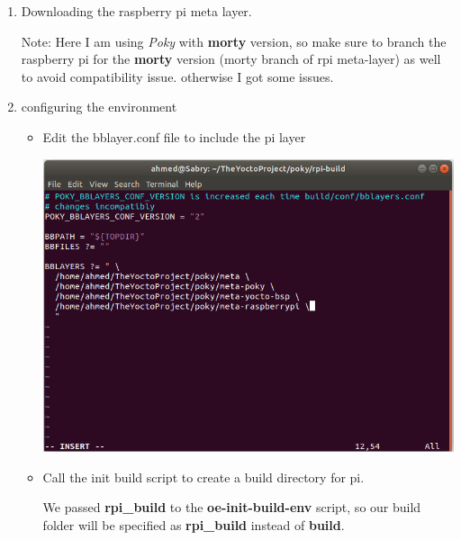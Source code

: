 \documentclass{article}
\begin{document}
\begin{enumerate}
    \item Downloading the raspberry pi meta layer.
    
    
    Note: Here I am using \textit{Poky} with \textbf{morty} version, so make sure to branch the raspberry pi for the \textbf{morty} version (morty branch of rpi meta-layer) as well to avoid compatibility issue. otherwise I got some issues.
  

    \item configuring the environment
    \begin{itemize}
        \item Edit the bblayer.conf file to include the pi layer
        
        
        \begin{center}
          \includegraphics[scale=0.60]{./resources/img/bblayers.conf-add-rpi-layer.png}
        \end{center}

        \item Call the init build script to create a build directory for pi.
        
        
        We passed \textbf{rpi\_build} to the \textbf{oe-init-build-env} script, so our build folder will be specified as \textbf{rpi\_build} instead of \textbf{build}.


\end{itemize}
\end{enumerate}
\end{document}
